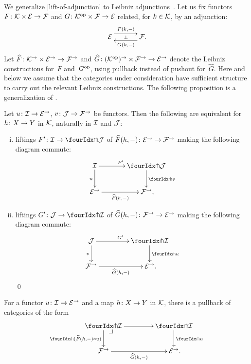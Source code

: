 \documentclass[reqno,10pt,a4paper,oneside,draft]{amsart}
\begin{document}
{{We generalize \cref{lift-of-adjunction} to Leibniz adjunctions~\cite{riehl-verity:reedy}.
Let us fix functors $F \co \cal{K} \times \catE \to \cal{F}$ and $G \co \cal{K}^{\op} \times \cal{F} \to \catE$ related, for $k \in \cal{K}$, by an adjunction:
\[
\xymatrix@C+1em{
  \catE
  \ar@<5pt>[r]^{F(k, \arghole)}
  \ar@{}[r]|{\bot}
&
  \cal{F}
  \ar@<5pt>[l]^{G(k, \arghole)}
\rlap{.}}
\]
Let $ \widehat{F} \co \cal{K}^\to \times \catE^\to \to \cal{F}^\to$ and $ \widehat{G} \co (\cal{K}^{\op})^\to \times \cal{F}^\to \to \catE^\to$ denote the Leibniz constructions for~$F$ and~$G^{\op}$, using pullback instead of pushout for~$\widehat{G}$.
Here and below we assume that the categories under consideration have sufficient structure to carry out the relevant Leibniz constructions.
The following proposition is a generalization of \cite[Theorem~6.5]{riehl-monoidal-ams}.

\begin{proposition} \label{lift-of-leibniz-adjunction}
Let $u \co \cal{I} \to \catE^\to$, $v \co \cal{J} \to \cal{F}^\to$ be functors.
Then the following are equivalent for $h \co X \to Y$ in $\cal{K}$, naturally in $\cal{I}$ and $\cal{J}$:
\begin{enumerate}[(i)]
\item liftings $F' \co \cal{I} \to \liftl{\cal{J}}$ of $\widehat{F}(h, \arghole) \co \catE^\to \to \cal{F}^\to$ making the following diagram commute:
\[
\xymatrix@C=1.2cm{
  \cal{I}
  \ar[r]^{F'}
  \ar[d]_{u}
&
  \liftl{\cal{J}}
  \ar[d]^{\liftl{v}}
\\
  \catE^\to
  \ar[r]_-{\widehat{F}(h, \arghole)}
&
  \cal{F}^\to
\rlap{,}}
\]
\item liftings $G' \co \cal{J} \to \liftr{\cal{I}}$ of $\widehat{G}(h, \arghole) \co \cal{F}^\to \to \catE^\to$ making the following diagram commute:
\[
\begin{gathered}
\xymatrix@C+2em{
  \cal{J}
  \ar[d]_{v}
  \ar[r]^{G'}
&
  \liftr{\cal{I}}
  \ar[d]^{\liftr{u}}
\\
  \cal{F}^\to
  \ar[r]_-{\widehat{G}(h, \arghole)}
&
  \catE^\to
\rlap{.}}
\end{gathered}
\]
\qed
\end{enumerate}
\end{proposition}


\newcommand{\Adj}{\operatorname{Adj}}
\newcommand{\catF}{\cal{F}}

\begin{corollary} \label{lift-of-leibniz-adjunction-pullback-form}
For a functor $u \co \cal{I} \to \cal{E}^\to$ and a map $h \co X \to Y$ in $\cal{K}$, there is a pullback of categories of the form
\[
\xymatrix@C=1.5cm{
  \liftr{\cal{I}}
  \ar[r]
  \ar[d]_{\liftr{(\widehat{F}(h, \arghole) \cc u)}}
  \pullback{dr}
&
  \liftr{\cal{I}}
  \ar[d]^{\liftr{u}}
\\
  \cal{F}^\to
  \ar[r]_-{\widehat{G}(h, \arghole)}
&
  \cal{E}^\to
\rlap{.}}
\]
\end{corollary}

}}
\end{document}
